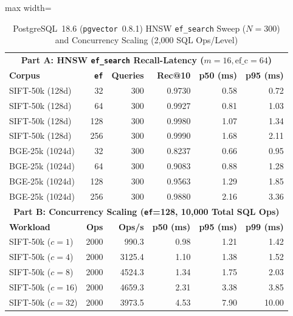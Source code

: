 \documentclass[10pt,journal,compsoc]{IEEEtran}
\begin{document}
\begin{table}[!t]
\centering
\caption{PostgreSQL~18.6 (\texttt{pgvector}~0.8.1) HNSW \texttt{ef\_search} Sweep ($N=300$) and Concurrency Scaling (2,000 SQL Ops/Level)}
\label{tab:hnsw}
\footnotesize
\setlength{\tabcolsep}{3.5pt}
\begin{adjustbox}{max width=\columnwidth}
\begin{tabular}{lrrrrr}
\toprule
\multicolumn{6}{c}{\textbf{Part A: HNSW \texttt{ef\_search} Recall-Latency ($m=16, \text{ef\_c}=64$)}} \\
\textbf{Corpus} & \textbf{\texttt{ef}} & \textbf{Queries} & \textbf{Rec@10} & \textbf{p50 (ms)} & \textbf{p95 (ms)} \\
\midrule
SIFT-50k (128d) & 32 & 300 & 0.9730 & 0.58 & 0.72 \\
SIFT-50k (128d) & 64 & 300 & 0.9927 & 0.81 & 1.03 \\
SIFT-50k (128d) & 128 & 300 & 0.9980 & 1.07 & 1.34 \\
SIFT-50k (128d) & 256 & 300 & 0.9990 & 1.68 & 2.11 \\
BGE-25k (1024d) & 32 & 300 & 0.8237 & 0.66 & 0.95 \\
BGE-25k (1024d) & 64 & 300 & 0.9083 & 0.88 & 1.28 \\
BGE-25k (1024d) & 128 & 300 & 0.9563 & 1.29 & 1.85 \\
BGE-25k (1024d) & 256 & 300 & 0.9880 & 2.16 & 3.36 \\
\midrule
\multicolumn{6}{c}{\textbf{Part B: Concurrency Scaling (\texttt{ef}=128, 10,000 Total SQL Ops)}} \\
\textbf{Workload} & \textbf{Ops} & \textbf{Ops/s} & \textbf{p50 (ms)} & \textbf{p95 (ms)} & \textbf{p99 (ms)} \\
\midrule
SIFT-50k ($c=1$) & 2000 & 990.3 & 0.98 & 1.21 & 1.42 \\
SIFT-50k ($c=4$) & 2000 & 3125.4 & 1.10 & 1.38 & 1.52 \\
SIFT-50k ($c=8$) & 2000 & 4524.3 & 1.34 & 1.75 & 2.03 \\
SIFT-50k ($c=16$) & 2000 & 4659.3 & 2.31 & 3.38 & 3.85 \\
SIFT-50k ($c=32$) & 2000 & 3973.5 & 4.53 & 7.90 & 10.00 \\
\bottomrule
\end{tabular}
\end{adjustbox}
\end{table}
\end{document}
